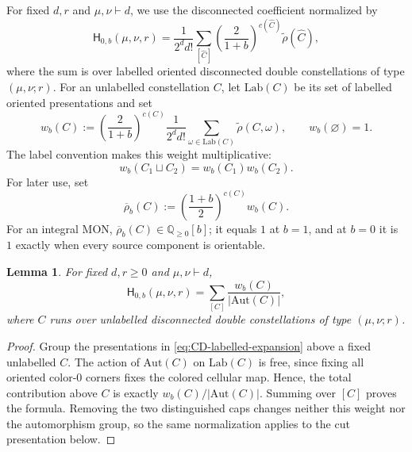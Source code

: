 \documentclass[11pt,a4paper,reqno]{article}
\newtheorem{lemma}[theorem]{Lemma}
\theoremstyle{definition}
\theoremstyle{remark}
\newcommand\Q{{\mathbb Q}}
\newcommand\Hb{{\mathsf H}}
\newcommand\Aut{{\mathrm{Aut}}}
\begin{document}
For fixed $d,r$ and $\mu,\nu\vdash d$, we use the disconnected coefficient normalized by
\begin{equation}\label{eq:CD-labelled-expansion}
\Hb_{0,b}(\mu,\nu,r) =\frac{1}{2^d d!} \sum_{[\widehat C]} \left(\frac{2}{1+b}\right)^{c(\widehat C)} \widetilde\rho(\widehat C),
\end{equation}
where the sum is over labelled oriented disconnected double constellations of type $(\mu,\nu;r)$.  For an unlabelled constellation $C$, let $\mathrm{Lab}(C)$ be its set of labelled oriented presentations and set
\begin{equation}\label{eq:CD-unlabelled-weight}
w_b(C) :=\left(\frac{2}{1+b}\right)^{c(C)} \frac1{2^d d!}\sum_{\omega\in\mathrm{Lab}(C)}\widetilde\rho(C,\omega), \qquad w_b(\varnothing)=1.
\end{equation}
The label convention makes this weight multiplicative:
\begin{equation}\label{eq:spherical-weight-multiplicative}
w_b(C_1\sqcup C_2)=w_b(C_1)w_b(C_2).
\end{equation}
For later use, set
\[
\overline\rho_b(C):=\left(\frac{1+b}{2}\right)^{c(C)}w_b(C).
\]
For an integral MON, $\overline\rho_b(C)\in\Q_{\geq0}[b]$; it equals $1$ at $b=1$, and at $b=0$ it is $1$ exactly when every source component is orientable.

\begin{lemma}\label{lem:CD-unlabelled-normalization}
For fixed $d,r\geq0$ and $\mu,\nu\vdash d$,
\begin{equation}\label{eq:CD-enumerative-definition}
\Hb_{0,b}(\mu,\nu,r) =\sum_{[C]}\frac{w_b(C)}{|\Aut(C)|},
\end{equation}
where $C$ runs over unlabelled disconnected double constellations of type $(\mu,\nu;r)$.
\end{lemma}

\begin{proof}
Group the presentations in \eqref{eq:CD-labelled-expansion} above a fixed unlabelled $C$.  The action of $\Aut(C)$ on $\mathrm{Lab}(C)$ is free, since fixing all oriented color-$0$ corners fixes the colored cellular map. Hence, the total contribution above $C$ is exactly $w_b(C)/|\Aut(C)|$.  Summing over $[C]$ proves the formula.  Removing the two distinguished caps changes neither this weight nor the automorphism group, so the same normalization applies to the cut presentation below.
\end{proof}
\end{document}
